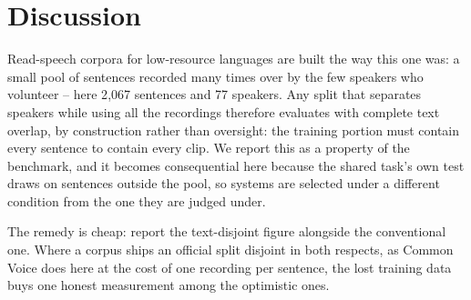 \section{Discussion}
\label{sec:discussion}

Read-speech corpora for low-resource languages are built the way this one was:
a small pool of sentences recorded many times over by the few speakers who
volunteer -- here 2{,}067 sentences and 77 speakers. Any split that separates speakers while using all the recordings therefore
evaluates with complete text overlap, by construction rather than oversight:
the training portion must contain every sentence to contain every clip. We report this as a
property of the benchmark, and it becomes consequential here because the shared
task's own test draws on sentences outside the pool, so systems are selected
under a different condition from the one they are judged under.

The remedy is cheap: report the text-disjoint figure alongside the conventional
one. Where a corpus ships an official split disjoint in both respects, as
Common Voice does here at the cost of one recording per sentence, the lost
training data buys one honest measurement among the optimistic ones.

